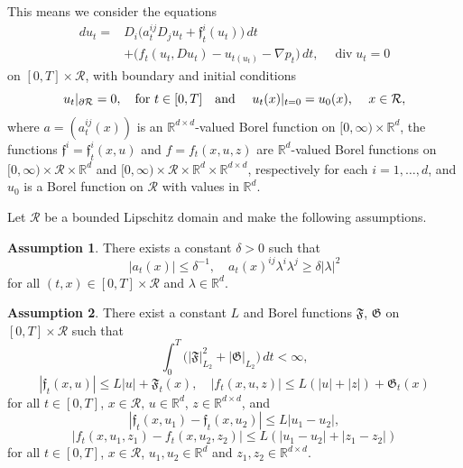 \documentclass[11pt,reqno]{amsart}
\theoremstyle{definition}
\newtheorem{assumption}{Assumption}[section]
\theoremstyle{remark}
\newcommand\bR{\mathbb{R}}
\newcommand\frf{\mathfrak{f}}
\newcommand\frF{\mathfrak{F}}
\newcommand\frG{\mathfrak{G}}
\newcommand\cR{\mathcal{R}}
\newcommand{\<}{\langle}
\renewcommand{\>}{\rangle}
\begin{document}
This means we consider the equations 
\begin{align}
du_t=&D_i\big(a_t^{ij}D_j u_t + \frf_t^i(u_t)\big)\,dt \nonumber\\
&+ \big(f_t(u_t,Du_t)- u_{t(u_t)}-\nabla p_t\big)\,dt, 
 \quad
\operatorname{div}u_t=0                            \label{NS3}
\end{align}
on $[0,T]\times\cR$, 
with boundary and initial 
conditions 
\begin{equation}
                                                         \label{bin3}
u_t|_{\partial \cR}=0, \quad \text{for $t\in[0,T]$\quad 
and
\quad 
$u_t(x)|_{t=0}=u_0(x)$,
\quad$ x\in\cR$},
\end{equation}
where $a=(a_t^{ij}(x))$ is an $\mathbb{R}^{d\times d}$-valued Borel 
function on $[0,\infty)\times\bR^d$, the functions 
$\frf^i=\frf^i_t(x,u)$ and $f=f_t(x,u,z)$ are $\bR^d$-valued Borel functions on 
$[0,\infty)\times\cR\times\bR^d$ and 
$[0,\infty)\times\cR\times\bR^d\times\bR^{d\times d}$, respectively 
for each $i=1,\dots,d$, and $u_0$ is a Borel function on $\cR$ with values 
in $\bR^d$.  

\smallskip

Let $\cR$ be a bounded Lipschitz domain and 
make the following assumptions. 

\begin{assumption}
                                                            \label{assumption1a}
There exists a constant $\delta>0$ such that
$$
|a_t(x)|\leq\delta^{-1},
\quad
a_t(x)^{ij}\lambda^i\lambda^j\geq\delta|\lambda|^2
$$
for all $(t,x)\in [0,T]\times\cR$ and $\lambda\in\bR^d$.
\end{assumption}

\begin{assumption} 
                                                   \label{assumption2a}
There exist a constant $L$ and Borel functions
$\mathfrak{F}$, $\mathfrak{G}$ on $[0,T]\times\cR$ such that
\begin{equation*}
                                              \label{integrability}
\int_0^T\big(|\mathfrak{F}|_{L_2}^2+|\mathfrak{G}|_{L_2}\big)\,dt<\infty, 
\end{equation*}
\begin{equation*}
|\frf_t(x,u)| \leq L|u|+\frF_t(x),
\quad |f_t(x,u,z)|\leq L(|u|+|z|)+\frG_t(x)
\end{equation*}
for all $t\in[0,T]$, $x\in\cR,\,u\in\mathbb R^d$, 
$z\in\mathbb R^{d\times d}$, and 
\begin{equation}
                                                            \label{lipschitz1a}
|\mathfrak{f}_t(x,u_1)-\mathfrak{f}_t(x,u_2)|
\leq L|u_1-u_2|,
\end{equation}
\begin{equation}
                                                                \label{lipschitz2a}
|f_t(x,u_1,z_1)-f_t(x,u_2,z_2)|
\leq
L(|u_1-u_2|+|z_1-z_2|)
\end{equation}
for all
$t\in[0,T]$, $x\in\cR$, $u_1, u_2\in\bR^d$ 
and  $z_1, z_2\in\mathbb R^{d\times d}$. 
\end{assumption}
\end{document}
